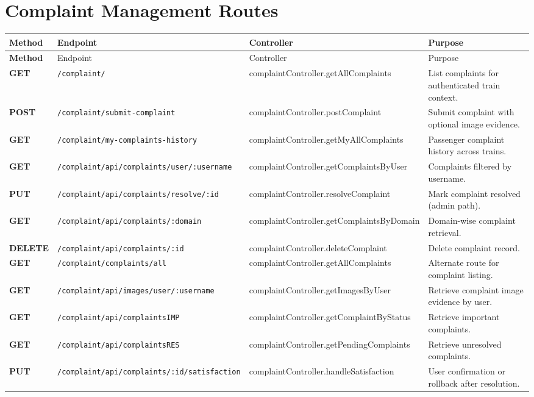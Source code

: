 \documentclass[12pt,a4paper]{report}
\renewcommand{\toprule}{\hline\hline}
\renewcommand{\midrule}{\hline}
\renewcommand{\bottomrule}{\hline\hline}
\begin{document}
\section{Complaint Management Routes}
\begin{longtable}{>{\bfseries}p{} p{} p{} p{}}
\toprule
\rowcolor{TableHeader}
\textcolor{TableHeaderText}{Method} & \textcolor{TableHeaderText}{Endpoint} & \textcolor{TableHeaderText}{Controller} & \textcolor{TableHeaderText}{Purpose} \\
\midrule
\endfirsthead
\toprule
\rowcolor{TableHeader}
\textcolor{TableHeaderText}{Method} & \textcolor{TableHeaderText}{Endpoint} & \textcolor{TableHeaderText}{Controller} & \textcolor{TableHeaderText}{Purpose} \\
\midrule
\endhead
GET & \texttt{/complaint/} & complaintController.getAllComplaints & List complaints for authenticated train context. \\
POST & \texttt{/complaint/submit-complaint} & complaintController.postComplaint & Submit complaint with optional image evidence. \\
GET & \texttt{/complaint/my-complaints-history} & complaintController.getMyAllComplaints & Passenger complaint history across trains. \\
GET & \texttt{/complaint/api/complaints/user/:username} & complaintController.getComplaintsByUser & Complaints filtered by username. \\
PUT & \texttt{/complaint/api/complaints/resolve/:id} & complaintController.resolveComplaint & Mark complaint resolved (admin path). \\
GET & \texttt{/complaint/api/complaints/:domain} & complaintController.getComplaintsByDomain & Domain-wise complaint retrieval. \\
DELETE & \texttt{/complaint/api/complaints/:id} & complaintController.deleteComplaint & Delete complaint record. \\
GET & \texttt{/complaint/complaints/all} & complaintController.getAllComplaints & Alternate route for complaint listing. \\
GET & \texttt{/complaint/api/images/user/:username} & complaintController.getImagesByUser & Retrieve complaint image evidence by user. \\
GET & \texttt{/complaint/api/complaintsIMP} & complaintController.getComplaintByStatus & Retrieve important complaints. \\
GET & \texttt{/complaint/api/complaintsRES} & complaintController.getPendingComplaints & Retrieve unresolved complaints. \\
PUT & \texttt{/complaint/api/complaints/:id/satisfaction} & complaintController.handleSatisfaction & User confirmation or rollback after resolution. \\
\bottomrule
\end{longtable}
\end{document}
